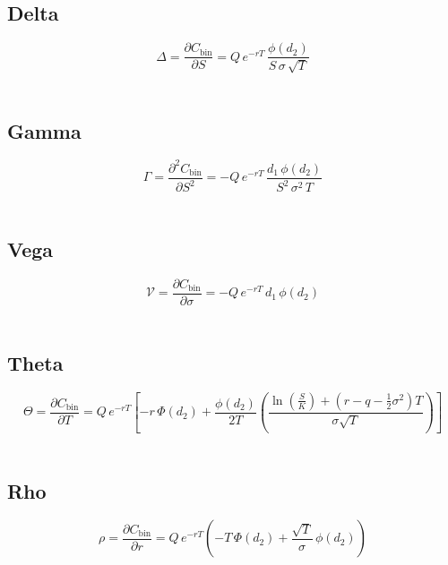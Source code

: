 \documentclass[12pt,a4paper]{article}
\begin{document}
\subsection{Delta}
\[
  \boxed{\Delta = \frac{\partial C_{\mathrm{bin}}}{\partial S} 
  = Q\, e^{-rT}\, \frac{\phi(d_2)}{S\,\sigma\,\sqrt{T}}}
\]

\[
  \begin{aligned}
  \end{aligned}
\]

\subsection{Gamma}
\[
  \boxed{\Gamma = \frac{\partial^2 C_{\mathrm{bin}}}{\partial S^2} 
  = -Q\, e^{-rT}\, \frac{d_1\,\phi(d_2)}{S^2\,\sigma^2\,T}}
\]

\[
  \begin{aligned}
  \end{aligned}
\]

\subsection{Vega}
\[
  \boxed{\mathcal{V} = \frac{\partial C_{\mathrm{bin}}}{\partial \sigma} 
  = -Q\, e^{-rT}\, d_1\,\phi(d_2)}
\]

\[
  \begin{aligned}
  \end{aligned}
\]

\subsection{Theta}
\[
  \boxed{\Theta = \frac{\partial C_{\mathrm{bin}}}{\partial T}
  = Q\, e^{-rT}\!\left[
  -r\,\Phi(d_2) 
  + \frac{\phi(d_2)}{2T}
    \left(
      \frac{\ln(\tfrac{S}{K}) + (r - q - \tfrac{1}{2}\sigma^2)T}{\sigma\sqrt{T}}
    \right)
  \right]}
\]

\[
  \begin{aligned}
  \end{aligned}
\]

\subsection{Rho}
\[
  \boxed{\rho = \frac{\partial C_{\mathrm{bin}}}{\partial r}
  = Q\, e^{-rT}\!\left(
    -T\,\Phi(d_2)
    + \frac{\sqrt{T}}{\sigma}\,\phi(d_2)
  \right)}
\]

\[
  \begin{aligned}
  \end{aligned}
\]
\end{document}
